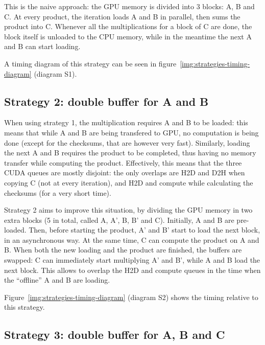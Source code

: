 This is the naive approach: the GPU memory is divided into 3 blocks: A, B and C.
At every product, the iteration loads A and B in parallel, then sums the product into C.
Whenever all the multiplications for a block of C are done, the block itself is unloaded to the CPU memory, while in the meantime the next A and B can start loading.

A timing diagram of this strategy can be seen in figure~\ref{img:strategies-timing-diagram} (diagram S1).


\subsection{Strategy 2: double buffer for A and B}

When using strategy 1, the multiplication requires A and B to be loaded: this means that while A and B are being transfered to GPU, no computation is being done (except for the checksums, that are however very fast).
Similarly, loading the next A and B requires the product to be completed, thus having no memory transfer while computing the product.
Effectively, this means that the three CUDA queues are mostly disjoint: the only overlaps are H2D and D2H when copying C (not at every iteration), and H2D and compute while calculating the checksums (for a very short time).

Strategy 2 aims to improve this situation, by dividing the GPU memory in two extra blocks (5 in total, called A, A', B, B' and C).
Initially, A and B are pre-loaded.
Then, before starting the product, A' and B' start to load the next block, in an asynchronous way.
At the same time, C can compute the product on A and B.
When both the new loading and the product are finished, the buffers are swapped: C can immediately start multiplying A' and B', while A and B load the next block.
This allows to overlap the H2D and compute queues in the time when the ``offline'' A and B are loading.

Figure~\ref{img:strategies-timing-diagram} (diagram S2) shows the timing relative to this strategy.


\subsection{Strategy 3: double buffer for A, B and C}

